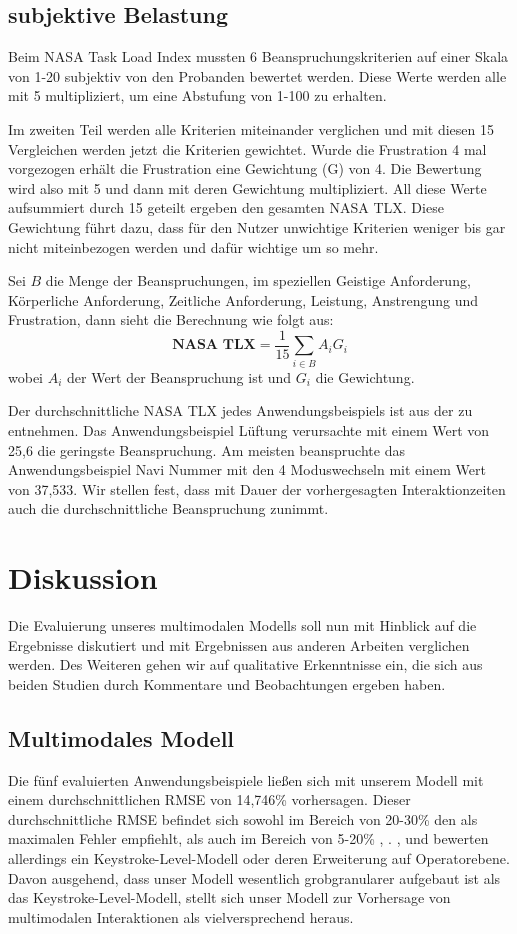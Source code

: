 \subsection{subjektive Belastung}
Beim NASA Task Load Index mussten 6 Beanspruchungskriterien auf einer Skala von 1-20 subjektiv von den Probanden bewertet werden. Diese Werte werden alle mit 5 multipliziert, um eine Abstufung von 1-100 zu erhalten. 

Im zweiten Teil werden alle Kriterien miteinander verglichen und mit diesen 15 Vergleichen werden jetzt die Kriterien gewichtet. Wurde die Frustration 4 mal vorgezogen erhält die Frustration eine Gewichtung (G) von 4. Die Bewertung wird also mit 5 und dann mit deren Gewichtung multipliziert. All diese Werte aufsummiert durch 15 geteilt ergeben den gesamten NASA TLX. Diese Gewichtung führt dazu, dass für den Nutzer unwichtige Kriterien weniger bis gar nicht miteinbezogen werden und dafür wichtige um so mehr. 

Sei $B$ die Menge der Beanspruchungen, im speziellen Geistige Anforderung, Körperliche Anforderung, Zeitliche Anforderung, Leistung, Anstrengung und Frustration, dann sieht die Berechnung wie folgt aus:
\[
\textbf{NASA TLX} =\frac{1}{15}\sum_{i \in B}A_{i}G_{i}
\]
wobei $A_i$ der Wert der Beanspruchung ist und $G_i$ die Gewichtung.

Der durchschnittliche NASA TLX jedes Anwendungsbeispiels ist aus der  zu entnehmen. Das Anwendungsbeispiel Lüftung verursachte mit einem Wert von 25,6 die geringste Beanspruchung. Am meisten beanspruchte das Anwendungsbeispiel Navi Nummer mit den 4 Moduswechseln mit einem Wert von 37,533.
Wir stellen fest, dass mit Dauer der vorhergesagten Interaktionzeiten auch die durchschnittliche Beanspruchung zunimmt.
\section[Diskussion]{Diskussion}
Die Evaluierung unseres multimodalen Modells soll nun mit Hinblick auf die Ergebnisse diskutiert und mit Ergebnissen aus anderen Arbeiten verglichen werden. Des Weiteren gehen wir auf qualitative Erkenntnisse ein, die sich aus beiden Studien durch Kommentare und Beobachtungen ergeben haben.

\subsection[Modell]{Multimodales Modell}
Die fünf evaluierten Anwendungsbeispiele ließen sich mit unserem Modell mit einem durchschnittlichen RMSE von 14,746\% vorhersagen. Dieser durchschnittliche RMSE befindet sich sowohl im Bereich von 20-30\% den \citet{Card_1980} als maximalen Fehler empfiehlt, als auch im Bereich von 5-20\% \citep{Luo_2005}, \citep{Teo:2006}. \citet{Card_1980}, \citet{Luo_2005} und \citet{Teo:2006} bewerten allerdings ein Keystroke-Level-Modell oder deren Erweiterung auf Operatorebene. Davon ausgehend, dass unser Modell wesentlich grobgranularer aufgebaut ist als das Keystroke-Level-Modell, stellt sich unser Modell zur Vorhersage von multimodalen Interaktionen als vielversprechend heraus. 

